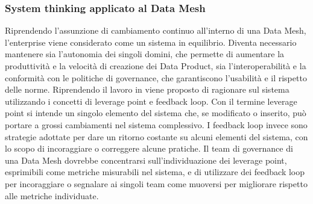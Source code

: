 \documentclass[a4paper,12pt]{report}
\begin{document}
\subsubsection{System thinking applicato al Data Mesh}
Riprendendo l'assunzione di cambiamento continuo all'interno di una Data Mesh, l'enterprise viene considerato come un sistema in equilibrio.
Diventa necessario mantenere sia l'autonomia dei singoli domini, che permette di aumentare la produttività e la velocità di creazione dei Data Product, sia l'interoperabilità e la conformità con le politiche di governance, che garantiscono l'usabilità e il rispetto delle norme. 
Riprendendo il lavoro in \cite{meadows_thinking_2008} viene proposto di ragionare sul sistema utilizzando i concetti di leverage point e feedback loop.
Con il termine leverage point si intende un singolo elemento del sistema che, se modificato o inserito, può portare a grossi cambiamenti nel sistema complessivo.
I feedback loop invece sono strategie adottate per dare un ritorno costante su alcuni elementi del sistema, con lo scopo di incoraggiare o correggere alcune pratiche.
Il team di governance di una Data Mesh dovrebbe concentrarsi sull'individuazione dei leverage point, esprimibili come metriche misurabili nel sistema, e di utilizzare dei feedback loop per incoraggiare o segnalare ai singoli team come muoversi per migliorare rispetto alle metriche individuate. 
\end{document}
